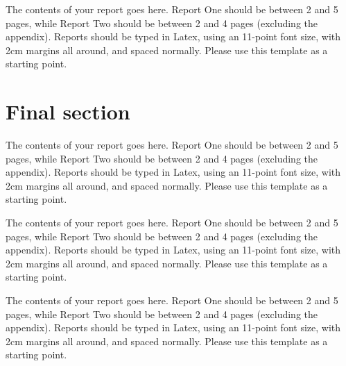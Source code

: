 \documentclass[a4paper,11pt]{article}
\begin{document}
The contents of your report goes here.  Report One should be between 2
and 5 pages, while Report Two should be between 2 and 4 pages
(excluding the appendix).  Reports should be typed in Latex, using an
11-point font size, with 2cm margins all around, and spaced normally.
Please use this template as a starting point.


\section{Final section}

The contents of your report goes here.  Report One should be between 2
and 5 pages, while Report Two should be between 2 and 4 pages
(excluding the appendix).  Reports should be typed in Latex, using an
11-point font size, with 2cm margins all around, and spaced normally.
Please use this template as a starting point.

The contents of your report goes here.  Report One should be between 2
and 5 pages, while Report Two should be between 2 and 4 pages
(excluding the appendix).  Reports should be typed in Latex, using an
11-point font size, with 2cm margins all around, and spaced normally.
Please use this template as a starting point.

The contents of your report goes here.  Report One should be between 2
and 5 pages, while Report Two should be between 2 and 4 pages
(excluding the appendix).  Reports should be typed in Latex, using an
11-point font size, with 2cm margins all around, and spaced normally.
Please use this template as a starting point.

{}

\end{document}
